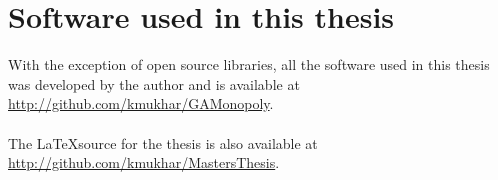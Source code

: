 \clearpage
\newpage
\chapter{Software used in this thesis}
\label{appendix:software}


With the exception of open source libraries, all the soft\-ware used in this
the\-sis was deve\-loped by the au\-thor and is available at
\url{http://github.com/kmukhar/GAMonopoly}. \\ \\

The \LaTeX source for the thesis is also available at
\url{http://github.com/kmukhar/MastersThesis}.
